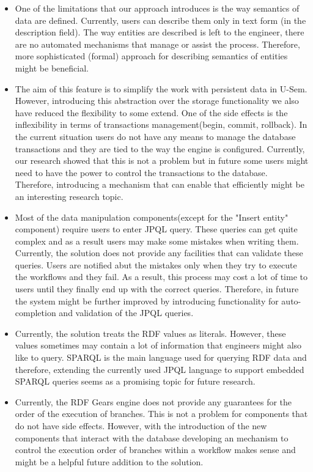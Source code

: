 \begin{itemize}
\item One of the limitations that our approach introduces is the way semantics of data are defined. Currently, users can describe them only in text form (in the description field). The way entities are described is left to the engineer, there are no automated mechanisms that manage or assist the process. Therefore, more sophisticated (formal) approach for describing semantics of entities might be beneficial.

\item The aim of this feature is to simplify the work with persistent data in U-Sem. However, introducing this abstraction over the storage functionality we also have reduced the flexibility to some extend. One of the side effects is the inflexibility in terms of transactions management(begin, commit, rollback). In the current situation users do not have any means to manage the database transactions and they are tied to the way the engine is configured. Currently, our research showed that this is not a problem but in future some users might need to have the power to control the transactions to the database. Therefore, introducing a mechanism that can enable that efficiently might be an interesting research topic.

\item Most of the data manipulation components(except for the "Insert entity" component) require users to enter JPQL query. These queries can get quite complex and as a result users may make some mistakes when writing them. Currently, the solution does not provide any facilities that can validate these queries. Users are notified abut the mistakes only when they try to execute the workflows and they fail. As a result, this process may cost a lot of time to users until they finally end up with the correct queries. Therefore, in future the system might be further improved by introducing functionality for auto-completion and validation of the JPQL queries.

\item Currently, the solution treats the RDF values as literals. However, these values sometimes may contain a lot of information that engineers might also like to query. SPARQL is the main language used for querying RDF data \cite{perez2006semantics} and therefore, extending the currently used JPQL language to support embedded SPARQL queries seems as a promising topic for future research.

\item Currently, the RDF Gears engine does not provide any guarantees for the order of the execution of branches. This is not a problem for components that do not have side effects. However, with the introduction of the new components that interact with the database developing an mechanism to control the execution order of branches within a workflow makes sense and might be a helpful future addition to the solution.


\end{itemize}
